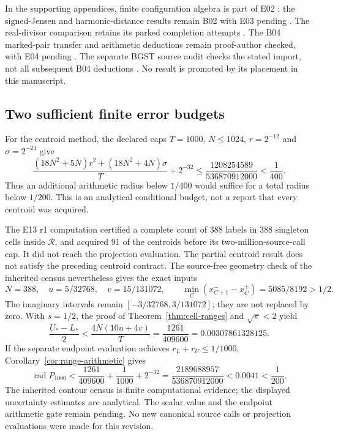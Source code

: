 In the supporting appendices, finite configuration algebra is part of
E02 \cite{OCFinite}; the signed-Jensen and harmonic-distance results
remain B02 with E03 pending \cite{OCHarmonic}. The real-divisor
comparison retains its parked completion attempts \cite{OCRealDivisor}.
The B04 marked-pair transfer and arithmetic deductions remain
proof-author checked, with E04 pending
\cite{OCPair,OCB04Check,OCArithmetic}. The separate BGST source audit
checks the stated import, not all subsequent B04 deductions
\cite{OCBGSTAudit,BGST2026PairI}. No result is promoted by its placement
in this manuscript.

\subsection{Two sufficient finite error budgets}

For the centroid method, the declared caps $T=1000$, $N\le1024$,
$r=2^{-12}$ and $\sigma=2^{-24}$ give
\[
 \frac{(18N^2+5N)r^2+(18N^2+4N)\sigma}{T}+2^{-32}
 \le\frac{1208254589}{536870912000}<\frac1{400}.
\]
Thus an additional arithmetic radius below $1/400$ would suffice for
a total radius below $1/200$. This is an analytical conditional budget,
not a report that every centroid was acquired.

The E13 r1 computation certified a complete count of 388 labels in
388 singleton cells inside $\mathcal R$, and acquired 91 of the
centroids before its two-million-source-call cap. It did not reach the
projection evaluation. The partial centroid result does not satisfy
the preceding centroid contract. The source-free geometry check of
the inherited census nevertheless gives the exact inputs
\[
 N=388,\quad u=5/32768,\quad v=15/131072,\qquad
 \min_C(x_{C+1}^- -x_C^+)=5085/8192>1/2.
\]
The imaginary intervals remain $[-3/32768,3/131072]$; they are not
replaced by zero. With $s=1/2$, the proof of
Theorem~\ref{thm:cell-ranges} and $\sqrt\pi<2$ yield
\[
 \frac{U_*-L_*}{2}<\frac{4N(10u+4v)}{T}
                  =\frac{1261}{409600}=0.00307861328125.
\]
If the separate endpoint evaluation achieves $r_L+r_U\le1/1000$,
Corollary~\ref{cor:range-arithmetic} gives
\[
 \operatorname{rad}P_{1000}
  <\frac{1261}{409600}+\frac1{1000}+2^{-32}
   =\frac{2189688957}{536870912000}<0.0041<\frac1{200}.
\]
The inherited contour census is finite computational evidence;
the displayed uncertainty estimates are analytical. The scalar value
and the endpoint arithmetic gate remain pending. No new canonical
source calls or projection evaluations were made for this revision.

